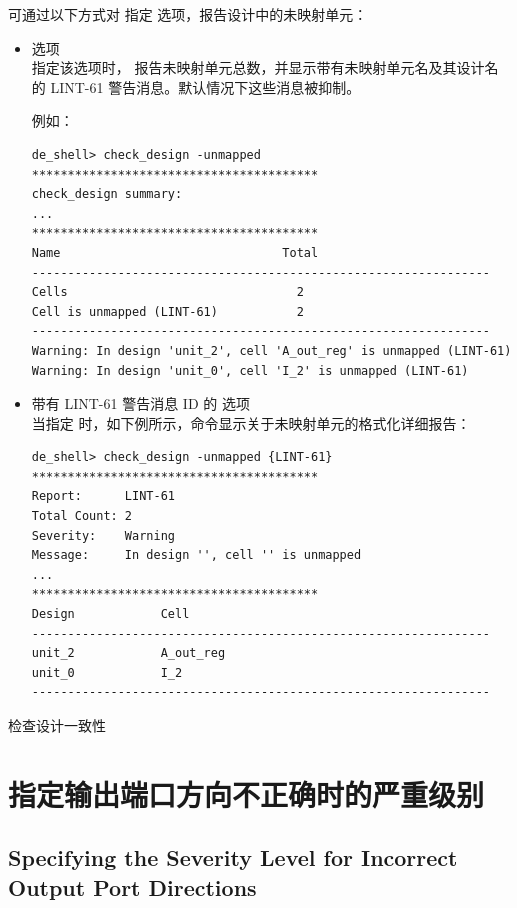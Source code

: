 可通过以下方式对  指定  选项，报告设计中的未映射单元：
\begin{itemize}
  \item {} 选项\\
        指定该选项时， 报告未映射单元总数，并显示带有未映射单元名及其设计名的 LINT-61 警告消息。默认情况下这些消息被抑制。

例如：
\begin{lstlisting}
de_shell> check_design -unmapped
****************************************
check_design summary:
...
****************************************
Name                               Total
----------------------------------------------------------------
Cells                                2
Cell is unmapped (LINT-61)           2
----------------------------------------------------------------
Warning: In design 'unit_2', cell 'A_out_reg' is unmapped (LINT-61)
Warning: In design 'unit_0', cell 'I_2' is unmapped (LINT-61)
\end{lstlisting}

  \item 带有 LINT-61 警告消息 ID 的  选项\\
        当指定  时，如下例所示，命令显示关于未映射单元的格式化详细报告：
\begin{lstlisting}
de_shell> check_design -unmapped {LINT-61}
****************************************
Report:      LINT-61
Total Count: 2
Severity:    Warning
Message:     In design '', cell '' is unmapped
...
****************************************
Design            Cell
----------------------------------------------------------------
unit_2            A_out_reg
unit_0            I_2
----------------------------------------------------------------
\end{lstlisting}
\end{itemize}

\begin{seeAlsoBox}
检查设计一致性
\end{seeAlsoBox}

\section{指定输出端口方向不正确时的严重级别}
\subsection*{Specifying the Severity Level for Incorrect Output Port Directions}

